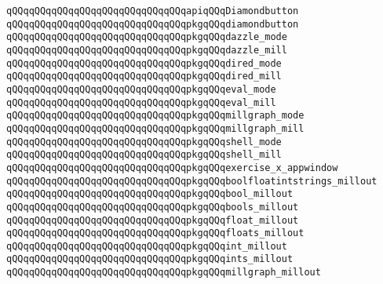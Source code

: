 \newline
\verb|qQQqqQQqqQQqqQQqqQQqqQQqqQQqqQQqapiqQQqDiamondbutton|\newline
\verb|qQQqqQQqqQQqqQQqqQQqqQQqqQQqqQQqpkgqQQqdiamondbutton|\newline
\newline
\verb|qQQqqQQqqQQqqQQqqQQqqQQqqQQqqQQqpkgqQQqdazzle_mode|\newline
\verb|qQQqqQQqqQQqqQQqqQQqqQQqqQQqqQQqpkgqQQqdazzle_mill|\newline
\newline
\verb|qQQqqQQqqQQqqQQqqQQqqQQqqQQqqQQqpkgqQQqdired_mode|\newline
\verb|qQQqqQQqqQQqqQQqqQQqqQQqqQQqqQQqpkgqQQqdired_mill|\newline
\newline
\verb|qQQqqQQqqQQqqQQqqQQqqQQqqQQqqQQqpkgqQQqeval_mode|\newline
\verb|qQQqqQQqqQQqqQQqqQQqqQQqqQQqqQQqpkgqQQqeval_mill|\newline
\newline
\verb|qQQqqQQqqQQqqQQqqQQqqQQqqQQqqQQqpkgqQQqmillgraph_mode|\newline
\verb|qQQqqQQqqQQqqQQqqQQqqQQqqQQqqQQqpkgqQQqmillgraph_mill|\newline
\newline
\verb|qQQqqQQqqQQqqQQqqQQqqQQqqQQqqQQqpkgqQQqshell_mode|\newline
\verb|qQQqqQQqqQQqqQQqqQQqqQQqqQQqqQQqpkgqQQqshell_mill|\newline
\newline
\verb|qQQqqQQqqQQqqQQqqQQqqQQqqQQqqQQqpkgqQQqexercise_x_appwindow|\newline
\newline
\verb|qQQqqQQqqQQqqQQqqQQqqQQqqQQqqQQqpkgqQQqboolfloatintstrings_millout|\newline
\verb|qQQqqQQqqQQqqQQqqQQqqQQqqQQqqQQqpkgqQQqbool_millout|\newline
\verb|qQQqqQQqqQQqqQQqqQQqqQQqqQQqqQQqpkgqQQqbools_millout|\newline
\verb|qQQqqQQqqQQqqQQqqQQqqQQqqQQqqQQqpkgqQQqfloat_millout|\newline
\verb|qQQqqQQqqQQqqQQqqQQqqQQqqQQqqQQqpkgqQQqfloats_millout|\newline
\verb|qQQqqQQqqQQqqQQqqQQqqQQqqQQqqQQqpkgqQQqint_millout|\newline
\verb|qQQqqQQqqQQqqQQqqQQqqQQqqQQqqQQqpkgqQQqints_millout|\newline
\verb|qQQqqQQqqQQqqQQqqQQqqQQqqQQqqQQqpkgqQQqmillgraph_millout|\newline
